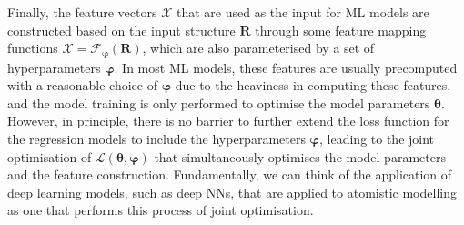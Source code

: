 Finally, the feature vectors $\bm{\mathcal{X}}$ that are used as the input for ML models are  constructed based on the input structure $\bm{R}$ through some feature mapping functions $\bm{\mathcal{X}}=\bm{\mathcal{F}}_{\boldsymbol{\varphi}}(\bm{R})$, which are also parameterised by a set of hyperparameters $\boldsymbol{\varphi}$. In most ML models, these features are usually precomputed with a reasonable choice of $\boldsymbol{\varphi}$ due to the heaviness in computing these features, and the model training is only performed to optimise the model parameters $\boldsymbol{\theta}$. However, in principle, there is no barrier to further extend the loss function for the regression models to include the hyperparameters $\boldsymbol{\varphi}$, leading to the joint optimisation of $\mathcal{L}(\boldsymbol{\theta},\boldsymbol{\varphi})$ that simultaneously optimises the model parameters and the feature construction. Fundamentally, we can think of the application of deep learning models, such as deep NNs, that are applied to atomistic modelling as one that performs this process of joint optimisation.\cite{schutt2017schnet,gomez2018automatic,duval2023hitchhiker,hou2024unsupervised} 


